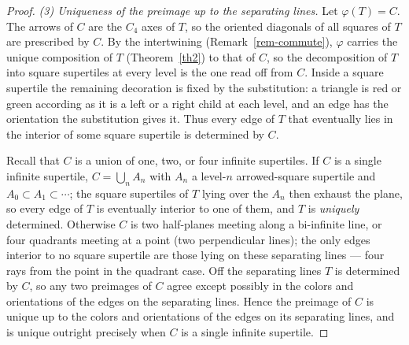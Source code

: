 \documentclass[11pt]{article}
\theoremstyle{remark}
\begin{document}
\begin{proof}
\smallskip
\noindent\emph{(3) Uniqueness of the preimage up to the separating lines.}
Let $\varphi(T)=C$. The arrows of $C$ are the $C_4$ axes of $T$, so the oriented
diagonals of all squares of $T$ are prescribed by $C$. By the intertwining
(Remark~\ref{rem-commute}), $\varphi$ carries the unique composition of $T$
(Theorem~\ref{th2}) to that of $C$, so the decomposition of $T$ into square
supertiles at every level is the one read off from $C$. Inside a square supertile
the remaining decoration is fixed by the substitution: a triangle is red or
green according as it is a left or a right child at each level, and an edge has
the orientation the substitution gives it. Thus every edge of $T$ that eventually
lies in the interior of some square supertile is determined by $C$.

Recall that $C$ is a union of one, two, or four infinite supertiles. If $C$ is a
single infinite supertile, $C=\bigcup_n A_n$ with $A_n$ a level-$n$
arrowed-square supertile and $A_0\subset A_1\subset\cdots$; the square supertiles
of $T$ lying over the $A_n$ then exhaust the plane, so every edge of $T$ is
eventually interior to one of them, and $T$ is \emph{uniquely} determined.
Otherwise $C$ is two half-planes meeting along a bi-infinite line, or four
quadrants meeting at a point (two perpendicular lines); the only edges interior
to no square supertile are those lying on these separating lines --- four rays
from the point in the quadrant case. Off the separating lines $T$ is determined
by $C$, so any two preimages of $C$ agree except possibly in the colors and
orientations of the edges on the separating lines. Hence the preimage of $C$ is
unique up to the colors and orientations of the edges on its separating lines,
and is unique outright precisely when $C$ is a single infinite supertile.
\end{proof}
\end{document}
